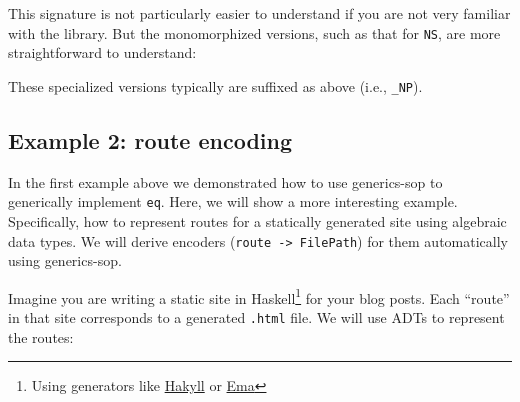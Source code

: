 \begin{Shaded}
\begin{Highlighting}[]
 \OtherTok{=\textgreater{}}\OtherTok{{-}\textgreater{}} 
\end{Highlighting}
\end{Shaded}

This signature is not particularly easier to understand if you are not
very familiar with the library. But the monomorphized versions, such as
that for \texttt{NS}, are more straightforward to understand:

\begin{Shaded}
\begin{Highlighting}[]
 \NormalTok{ (}\OtherTok{{-}\textgreater{}}\NormalTok{ [a]}
\end{Highlighting}
\end{Shaded}

These specialized versions typically are suffixed as above (i.e.,
\texttt{\_NP}).

\hypertarget{example-2-route-encoding}{%
\subsection{Example 2: route encoding}\label{example-2-route-encoding}}

In the first example above we demonstrated how to use generics-sop to
generically implement \texttt{eq}. Here, we will show a more interesting
example. Specifically, how to represent routes for a statically
generated site using algebraic data types. We will derive encoders
(\texttt{route\ -\textgreater{}\ FilePath}) for them automatically using
generics-sop.

Imagine you are writing a static site in Haskell\footnote{Using
  generators like \href{https://jaspervdj.be/hakyll/}{Hakyll} or
  \href{https://ema.srid.ca/}{Ema}} for your blog posts. Each ``route''
in that site corresponds to a generated \texttt{.html} file. We will use
ADTs to represent the routes:

\begin{Shaded}
\begin{Highlighting}[]
 
  \OtherTok{=}  
  \OperatorTok{|}   

 
  \OtherTok{=}  
  \OperatorTok{|}   

  \OtherTok{=} \NormalTok{ \{} \NormalTok{\}}
\end{Highlighting}
\end{Shaded}

